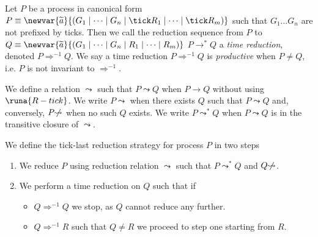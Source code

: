 %
\begin{defi}\label{def:timereduction}
Let $P$ be a process in canonical form $P \equiv \newvar{\widetilde{a}}{(G_1\mid\dots\mid G_n \mid \tick R_1 \mid\dots\mid\tick R_m)}$ such that $G_1\dots G_n$ are not prefixed by ticks. Then we call the reduction sequence from $P$ to $Q\equiv \newvar{\widetilde{a}}{(G_1\mid\dots\mid G_n \mid R_1 \mid\dots\mid R_m)}$ $P\longrightarrow^* Q$ a \textit{time reduction}, denoted $P \Longrightarrow^{-1} Q$. We say a time reduction $P\Longrightarrow^{-1} Q$ is \textit{productive} when $P\neq Q$, i.e. $P$ is not invariant to $\Longrightarrow^{-1}$.
\end{defi}

\begin{defi}\label{def:nontempreduction}
We define a relation $\leadsto$ such that $P\leadsto Q$ when $P \longrightarrow Q$ without using $\runa{R-tick}$. We write $P\!\!\leadsto$ when there exists $Q$ such that $P\leadsto Q$ and, conversely, $P\!\not\!\leadsto$ when no such $Q$ exists. We write $P \leadsto^* Q$ when $P\leadsto Q$ is in the transitive closure of $\leadsto$.
\end{defi}

\begin{defi}\label{def:ticklaststrat}
We define the tick-last reduction strategy for process $P$ in two steps
\begin{enumerate}
    \item We reduce $P$ using reduction relation $\leadsto$ such that $P\leadsto^* Q$  and $Q\!\not\!\leadsto$.
    
    \item We perform a time reduction on $Q$ such that if
    \begin{itemize}
        \item $Q \Longrightarrow^{-1} Q$ we stop, as $Q$ cannot reduce any further.
        \item $Q \Longrightarrow^{-1} R$ such that $Q \neq R$ we proceed to step one starting from $R$.  
    \end{itemize}
\end{enumerate}
\end{defi}

